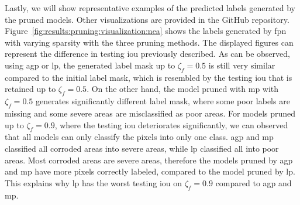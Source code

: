 \documentclass[mathematics,article,submit,pdftex,moreauthors]{Definitions/mdpi}
\begin{document}
Lastly, we will show representative examples
of the predicted labels generated by the pruned
models. Other visualizations are provided in the GitHub repository.
Figure~\ref{fig:results:pruning:visualization:nea} 
shows the labels generated by \ac{fpn} 
with varying sparsity with the three pruning methods. 
The displayed figures
can represent the difference in testing \ac{iou}
previously described. As can be observed, 
using \ac{agp} or \ac{lp},
the generated label mask up to $\zeta_f=0.5$ is
still very similar compared to the initial label mask,
which is resembled by the testing \ac{iou}
that is retained up to $\zeta_f=0.5$. 
On the other hand, the model pruned with \ac{mp}
with $\zeta_f=0.5$ generates significantly different
label mask, where some poor labels are missing and
some severe areas are misclassified as poor areas.
For models pruned up to $\zeta_f=0.9$, where 
the testing \ac{iou} deteriorates significantly, 
we can observed that all models can only classify
the pixels into only one class. \ac{agp} and \ac{mp}
classified all corroded areas into severe areas,
while \ac{lp} classified all into poor areas. Most
corroded areas are severe areas, therefore 
the models pruned by \ac{agp} and \ac{mp}
have more pixels correctly labeled, compared to the model
pruned by \ac{lp}. This explains 
why \ac{lp} has the worst testing \ac{iou} on
$\zeta_f=0.9$ compared to \ac{agp} and \ac{mp}.
\end{document}

